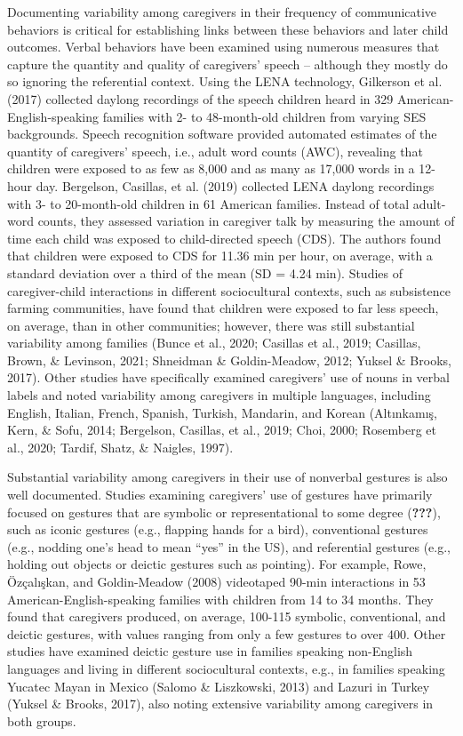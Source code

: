\documentclass[
  english,
  man,floatsintext]{apa6}
\begin{document}
Documenting variability among caregivers in their frequency of communicative behaviors is critical for establishing links between these behaviors and later child outcomes. Verbal behaviors have been examined using numerous measures that capture the quantity and quality of caregivers' speech -- although they mostly do so ignoring the referential context. Using the LENA technology, Gilkerson et al. (2017) collected daylong recordings of the speech children heard in 329 American-English-speaking families with 2- to 48-month-old children from varying SES backgrounds. Speech recognition software provided automated estimates of the quantity of caregivers' speech, i.e., adult word counts (AWC), revealing that children were exposed to as few as 8,000 and as many as 17,000 words in a 12-hour day. Bergelson, Casillas, et al. (2019) collected LENA daylong recordings with 3- to 20-month-old children in 61 American families. Instead of total adult-word counts, they assessed variation in caregiver talk by measuring the amount of time each child was exposed to child-directed speech (CDS). The authors found that children were exposed to CDS for 11.36 min per hour, on average, with a standard deviation over a third of the mean (SD = 4.24 min). Studies of caregiver-child interactions in different sociocultural contexts, such as subsistence farming communities, have found that children were exposed to far less speech, on average, than in other communities; however, there was still substantial variability among families (Bunce et al., 2020; Casillas et al., 2019; Casillas, Brown, \& Levinson, 2021; Shneidman \& Goldin-Meadow, 2012; Yuksel \& Brooks, 2017). Other studies have specifically examined caregivers' use of nouns in verbal labels and noted variability among caregivers in multiple languages, including English, Italian, French, Spanish, Turkish, Mandarin, and Korean (Altınkamış, Kern, \& Sofu, 2014; Bergelson, Casillas, et al., 2019; Choi, 2000; Rosemberg et al., 2020; Tardif, Shatz, \& Naigles, 1997).

Substantial variability among caregivers in their use of nonverbal gestures is also well documented. Studies examining caregivers' use of gestures have primarily focused on gestures that are symbolic or representational to some degree ({\textbf{???}}), such as iconic gestures (e.g., flapping hands for a bird), conventional gestures (e.g., nodding one's head to mean \enquote{yes} in the US), and referential gestures (e.g., holding out objects or deictic gestures such as pointing). For example, Rowe, Özçalışkan, and Goldin-Meadow (2008) videotaped 90-min interactions in 53 American-English-speaking families with children from 14 to 34 months. They found that caregivers produced, on average, 100-115 symbolic, conventional, and deictic gestures, with values ranging from only a few gestures to over 400. Other studies have examined deictic gesture use in families speaking non-English languages and living in different sociocultural contexts, e.g., in families speaking Yucatec Mayan in Mexico (Salomo \& Liszkowski, 2013) and Lazuri in Turkey (Yuksel \& Brooks, 2017), also noting extensive variability among caregivers in both groups.
\end{document}
